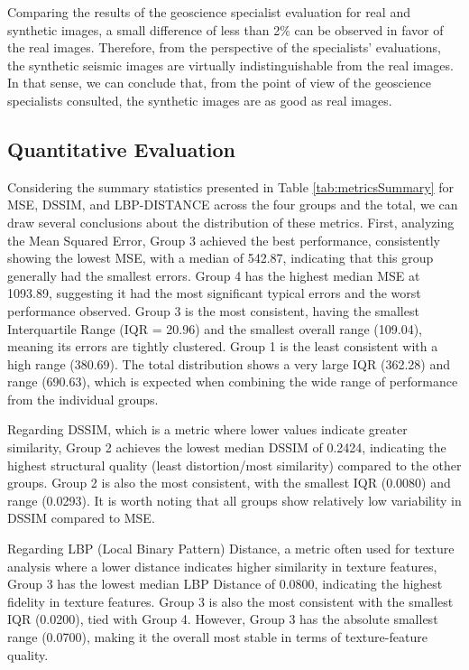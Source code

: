 \documentclass{ieeeaccess}
\begin{document}
Comparing the results of the geoscience specialist evaluation for real and synthetic images, a small difference of less than 2\% can be observed in favor of the real images. Therefore, from the perspective of the specialists' evaluations, the synthetic seismic images are virtually indistinguishable from the real images. In that sense, we can conclude that, from the point of view of the geoscience specialists consulted, the synthetic images are as good as real images.

\subsection{Quantitative Evaluation} 

Considering the summary statistics presented in Table \ref{tab:metricsSummary} for MSE, DSSIM, and LBP-DISTANCE across the four groups and the total, we can draw several conclusions about the distribution of these metrics. First, analyzing the Mean Squared Error, Group 3 achieved the best performance, consistently showing the lowest MSE, with a median of 542.87, indicating that this group generally had the smallest errors. Group 4 has the highest median MSE at 1093.89, suggesting it had the most significant typical errors and the worst performance observed. Group 3 is the most consistent, having the smallest Interquartile Range (IQR = 20.96) and the smallest overall range (109.04), meaning its errors are tightly clustered. Group 1 is the least consistent with a high range (380.69). The total distribution shows a very large IQR (362.28) and range (690.63), which is expected when combining the wide range of performance from the individual groups.

Regarding DSSIM, which is a metric where lower values indicate greater similarity, Group 2 achieves the lowest median DSSIM of 0.2424, indicating the highest structural quality (least distortion/most similarity) compared to the other groups. Group 2 is also the most consistent, with the smallest IQR (0.0080) and range (0.0293). It is worth noting that all groups show relatively low variability in DSSIM compared to MSE.

Regarding LBP (Local Binary Pattern) Distance, a metric often used for texture analysis where a lower distance indicates higher similarity in texture features, Group 3 has the lowest median LBP Distance of 0.0800, indicating the highest fidelity in texture features. Group 3 is also the most consistent with the smallest IQR (0.0200), tied with Group 4. However, Group 3 has the absolute smallest range (0.0700), making it the overall most stable in terms of texture-feature quality.
\end{document}
